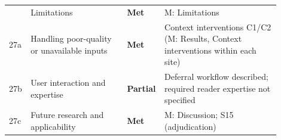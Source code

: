 \documentclass[9pt,a4paper]{extarticle}
\newcommand{\met}{\textbf{Met}}
\newcommand{\partl}{\textbf{Partial}}
\begin{document}
\begin{longtable}{>{\raggedright\arraybackslash}p{0.05\linewidth}>{\raggedright\arraybackslash}p{0.35\linewidth}>{\raggedright\arraybackslash}p{0.08\linewidth}>{\raggedright\arraybackslash}p{0.42\linewidth}}
26 & Limitations & \met & M: Limitations\\
27a & Handling poor-quality or unavailable inputs & \met & Context interventions C1/C2 (M: Results, Context interventions within each site)\\
27b & User interaction and expertise & \partl & Deferral workflow described; required reader expertise not specified\\
27c & Future research and applicability & \met & M: Discussion; S15 (adjudication)\\
\bottomrule
\end{longtable}
\end{document}
